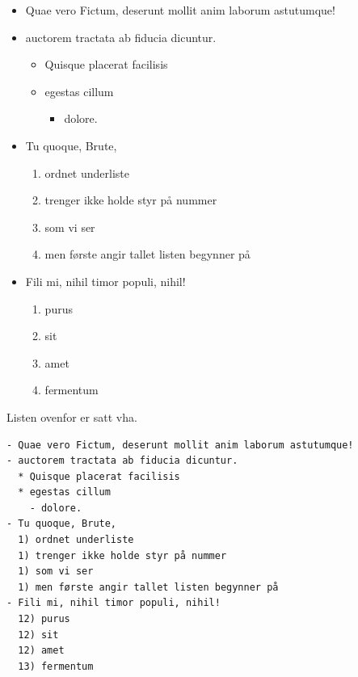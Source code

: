 \documentclass[
]{article}
\providecommand{\tightlist}{%
  \setlength{\itemsep}{0pt}\setlength{\parskip}{0pt}}
\begin{document}
\begin{itemize}
\item
  Quae vero Fictum, deserunt mollit anim laborum astutumque!
\item
  auctorem tractata ab fiducia dicuntur.

  \begin{itemize}
  \item
    Quisque placerat facilisis
  \item
    egestas cillum

    \begin{itemize}
    \tightlist
    \item
      dolore.
    \end{itemize}
  \end{itemize}
\item
  Tu quoque, Brute,

  \begin{enumerate}
  \def\labelenumi{\arabic{enumi})}
  \tightlist
  \item
    ordnet underliste
  \item
    trenger ikke holde styr på nummer
  \item
    som vi ser
  \item
    men første angir tallet listen begynner på
  \end{enumerate}
\item
  Fili mi, nihil timor populi, nihil!

  \begin{enumerate}
  \def\labelenumi{\arabic{enumi})}
  \setcounter{enumi}{11}
  \tightlist
  \item
    purus
  \item
    sit
  \item
    amet
  \item
    fermentum
  \end{enumerate}
\end{itemize}

Listen ovenfor er satt vha.

\begin{verbatim}
- Quae vero Fictum, deserunt mollit anim laborum astutumque!
- auctorem tractata ab fiducia dicuntur.
  * Quisque placerat facilisis 
  * egestas cillum 
    - dolore.
- Tu quoque, Brute, 
  1) ordnet underliste
  1) trenger ikke holde styr på nummer
  1) som vi ser
  1) men første angir tallet listen begynner på
- Fili mi, nihil timor populi, nihil!
  12) purus 
  12) sit 
  12) amet 
  13) fermentum
\end{verbatim}
\end{document}
